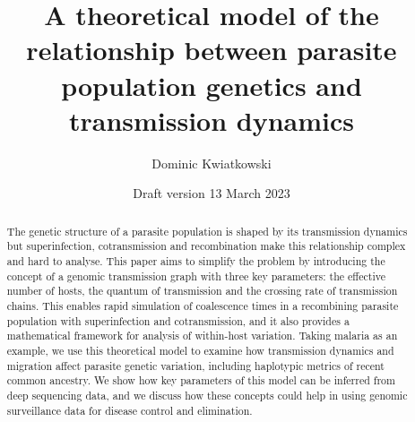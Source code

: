 \documentclass[hidelinks,10pt]{article}
\title{A theoretical model of the relationship between parasite population genetics and  transmission dynamics}
\date{Draft version 13 March 2023}
\author{Dominic Kwiatkowski}
\begin{document}
\maketitle

\begin{abstract}

The genetic structure of a parasite population is shaped by its transmission dynamics but superinfection, cotransmission and recombination make this relationship complex and hard to analyse.  This paper aims to simplify the problem by introducing the concept of a genomic transmission graph with three key parameters: the effective number of hosts, the quantum of transmission and the crossing rate of transmission chains.  This enables rapid simulation of coalescence times in a recombining parasite population with superinfection and cotransmission, and it also provides a mathematical framework for analysis of within-host variation. Taking malaria as an example, we use this theoretical model to examine how transmission dynamics and migration affect parasite genetic variation, including haplotypic metrics of recent common ancestry.  We show how key parameters of this model can be inferred from deep sequencing data, and we discuss how these concepts could help in using genomic surveillance data for disease control and elimination. 


\end{abstract}

\end{document}

